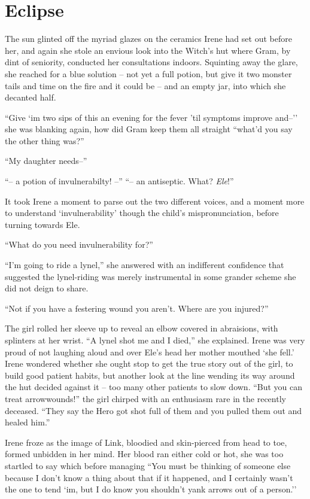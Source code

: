 \documentclass[../../FGP.tex]{subfiles}
\begin{document}
\section{Eclipse}
The sun glinted off the myriad glazes on the ceramics Irene had set out before her, and again she stole an envious look into the Witch's hut where Gram, by dint of seniority, conducted her consultations indoors. Squinting away the glare, she reached for a blue solution -- not yet a full potion, but give it two monster tails and time on the fire and it could be -- and an empty jar, into which she decanted half. 

``Give `im two sips of this an evening for the fever 'til symptoms improve and--'' she was blanking again, how did Gram keep them all straight ``what'd you say the other thing was?''

``My daughter needs--''

``-- a potion of invulnerabilty! --''\quad
``-- an antiseptic. What? \emph{Ele}!'' %

It took Irene a moment to parse out the two different voices, and a moment more to understand `invulnerability' though the child's mispronunciation, before turning towards Ele. 

``What do you need invulnerability for?''

``I'm going to ride a lynel,'' she answered with an indifferent confidence that suggested the lynel-riding was merely instrumental in some grander scheme she did not deign to share.

``Not if you have a festering wound you aren't. Where are you injured?''

The girl rolled her sleeve up to reveal an elbow covered in abraisions, with splinters at her wrist. ``A lynel shot me and I died,'' she explained. Irene was very proud of not laughing aloud and over Ele's head her mother mouthed `she fell.' Irene wondered whether she ought stop to get the true story out of the girl, to build good patient habits, but another look at the line wending its way around the hut decided against it -- too many other patients to slow down. ``But you can treat arrowwounds!'' the girl chirped with an enthusiasm rare in the recently deceased. ``They say the Hero got shot full of them and you pulled them out and healed him.'' 

Irene froze as the image of Link, bloodied and skin-pierced from head to toe, formed unbidden in her mind. Her blood ran either cold or hot, she was too startled to say which before managing ``You must be thinking of someone else because I don't know a thing about that if it happened, and I certainly wasn't the one to tend `im, but I do know you shouldn't yank arrows out of a person.''
\end{document}
